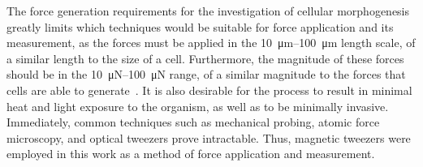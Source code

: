 The force generation requirements for the investigation of cellular morphogenesis greatly limits which techniques would be suitable for force application and its measurement, as the forces must be applied in the \SIrange{10}{100}{\micro\metre} length scale, of a similar length to the size of a cell.
Furthermore, the magnitude of these forces should be in the \SIrange{10}{100}{\micro\newton} range, of a similar magnitude to the forces that cells are able to generate~\cite{}.
It is also desirable for the process to result in minimal heat and light exposure to the organism, as well as to be minimally invasive.
Immediately, common techniques such as mechanical probing, atomic force microscopy, and optical tweezers prove intractable.
Thus, magnetic tweezers were employed in this work as a method of force application and measurement.

